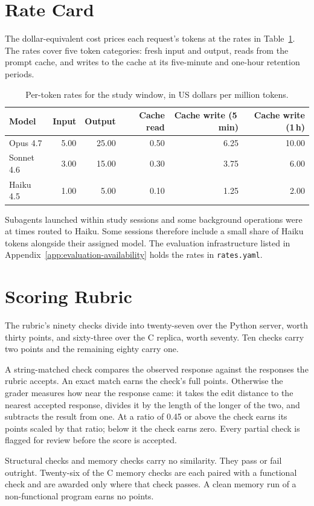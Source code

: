 \section{Rate Card}
\label{app:evaluation-rate-card}

The dollar-equivalent cost prices each request's tokens at the rates in Table~\ref{tab:evaluation-rate-card}. The rates cover five token categories: fresh input and output, reads from the prompt cache, and writes to the cache at its five-minute and one-hour retention periods.

\begin{table}[H]
  \centering
  \caption{Per-token rates for the study window, in US dollars per million tokens.}
  \label{tab:evaluation-rate-card}
  \begin{tabular*}{\textwidth}{@{\extracolsep{\fill}}lrrrrr}
    \toprule
    Model & Input & Output & Cache read & Cache write (5\,min) & Cache write (1\,h) \\
    \midrule
    Opus 4.7 & 5.00 & 25.00 & 0.50 & 6.25 & 10.00 \\
    Sonnet 4.6 & 3.00 & 15.00 & 0.30 & 3.75 & 6.00 \\
    Haiku 4.5 & 1.00 & 5.00 & 0.10 & 1.25 & 2.00 \\
    \bottomrule
  \end{tabular*}
\end{table}

Subagents launched within study sessions and some background operations were at times routed to Haiku. Some sessions therefore include a small share of Haiku tokens alongside their assigned model. The evaluation infrastructure listed in Appendix~\ref{app:evaluation-availability} holds the rates in \texttt{rates.yaml}.

\section{Scoring Rubric}
\label{app:evaluation-rubric}

The rubric's ninety checks divide into twenty-seven over the Python server, worth thirty points, and sixty-three over the C replica, worth seventy. Ten checks carry two points and the remaining eighty carry one.

A string-matched check compares the observed response against the responses the rubric accepts. An exact match earns the check's full points. Otherwise the grader measures how near the response came: it takes the edit distance to the nearest accepted response, divides it by the length of the longer of the two, and subtracts the result from one. At a ratio of 0.45 or above the check earns its points scaled by that ratio; below it the check earns zero. Every partial check is flagged for review before the score is accepted.

Structural checks and memory checks carry no similarity. They pass or fail outright. Twenty-six of the C memory checks are each paired with a functional check and are awarded only where that check passes. A clean memory run of a non-functional program earns no points.

